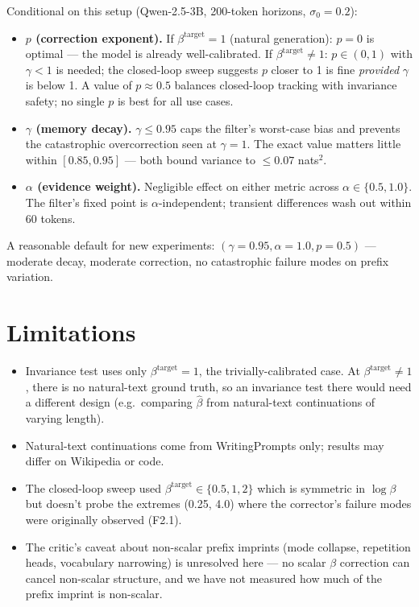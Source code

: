 \documentclass[11pt]{article}
\begin{document}
Conditional on this setup (Qwen-2.5-3B, 200-token horizons, $\sigma_0 = 0.2$):

\begin{itemize}
\item \textbf{$p$ (correction exponent).} If $\beta^{\mathrm{target}} = 1$
(natural generation): $p = 0$ is optimal --- the model is already
well-calibrated. If $\beta^{\mathrm{target}} \neq 1$: $p \in (0, 1)$ with
$\gamma < 1$ is needed; the closed-loop sweep suggests $p$ closer to 1 is
fine \emph{provided} $\gamma$ is below 1. A value of $p \approx 0.5$
balances closed-loop tracking with invariance safety; no single $p$ is
best for all use cases.
\item \textbf{$\gamma$ (memory decay).} $\gamma \le 0.95$ caps the
filter's worst-case bias and prevents the catastrophic overcorrection
seen at $\gamma = 1$. The exact value matters little within $[0.85,
0.95]$ --- both bound variance to $\le 0.07$ nats$^2$.
\item \textbf{$\alpha$ (evidence weight).} Negligible effect on either
metric across $\alpha \in \{0.5, 1.0\}$. The filter's fixed point is
$\alpha$-independent; transient differences wash out within 60 tokens.
\end{itemize}

A reasonable default for new experiments: $(\gamma = 0.95, \alpha = 1.0,
p = 0.5)$ --- moderate decay, moderate correction, no catastrophic
failure modes on prefix variation.

\section{Limitations}

\begin{itemize}
\item Invariance test uses only $\beta^{\mathrm{target}} = 1$, the
trivially-calibrated case. At $\beta^{\mathrm{target}} \neq 1$, there is
no natural-text ground truth, so an invariance test there would need a
different design (e.g.\ comparing $\hat\beta$ from natural-text continuations
of varying length).
\item Natural-text continuations come from WritingPrompts only; results
may differ on Wikipedia or code.
\item The closed-loop sweep used $\beta^{\mathrm{target}} \in \{0.5, 1, 2\}$
which is symmetric in $\log\beta$ but doesn't probe the extremes
(0.25, 4.0) where the corrector's failure modes were originally observed
(F2.1).
\item The critic's caveat about non-scalar prefix imprints (mode
collapse, repetition heads, vocabulary narrowing) is unresolved here ---
no scalar $\beta$ correction can cancel non-scalar structure, and we
have not measured how much of the prefix imprint is non-scalar.
\end{itemize}
\end{document}
